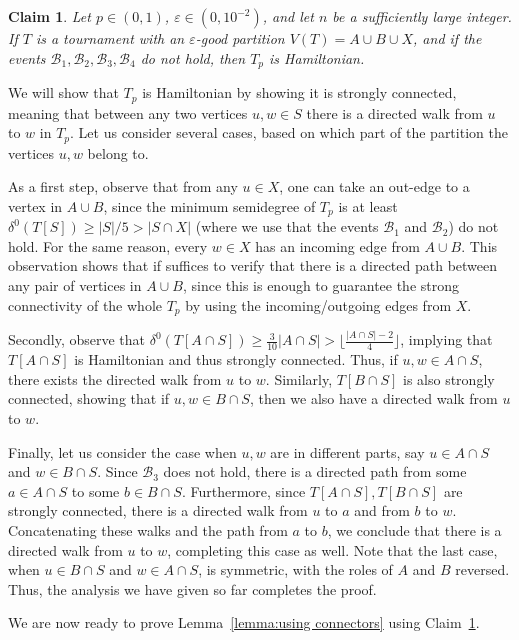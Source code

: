 \documentclass[a4paper,11pt]{article}
\makeatletter
\renewenvironment{proof}[1][\proofname] {\par\pushQED{\qed}\normalfont\topsep6\p@\@plus6\p@\relax\trivlist\item[\hskip\labelsep\textit{#1}\@addpunct{.}]\ignorespaces}{\popQED\endtrivlist\@endpefalse}
\newtheorem{claim}[theorem]{\bf Claim}
\theoremstyle{definition}
\def\eps{\varepsilon}
\def\cB{\mathcal{B}}
\makeatother
\begin{document}
\begin{claim}\label{claim:proving hamiltonicity}
Let $p\in (0, 1)$, $\eps\in (0, 10^{-2})$, and let $n$ be a sufficiently large integer. If $T$ is a tournament with an $\eps$-good partition $V(T)=A\cup B\cup X$, and if the events $\cB_1, \cB_2, \cB_3, \cB_4$ do not hold, then $T_p$ is Hamiltonian.
\end{claim}
\begin{proof}
We will show that $T_p$ is Hamiltonian by showing it is strongly connected, meaning that between any two vertices $u, w\in S$ there is a directed walk from $u$ to $w$ in $T_p$. Let us consider several cases, based on which part of the partition the vertices $u, w$ belong to. 

As a first step, observe that from any $u\in X$, one can take an out-edge to a vertex in $A\cup B$, since the minimum semidegree of $T_p$ is at least $\delta^0(T[S])\geq |S|/5 > |S\cap X|$ (where we use that the events $\cB_1$ and $\cB_2$) do not hold. For the same reason, every $w\in X$ has an incoming edge from $A\cup B$. This observation shows that if suffices to verify that there is a directed path between any pair of vertices in $A\cup B$, since this is enough to guarantee the strong connectivity of the whole $T_p$ by using the incoming/outgoing edges from $X$.

Secondly, observe that $\delta^0(T[A\cap S])\geq \frac{3}{10}|A\cap S|> \lfloor \frac{|A\cap S|-2}{4}\rfloor$, implying that $T[A\cap S]$ is Hamiltonian and thus strongly connected. Thus, if $u, w\in A\cap S$, there exists the directed walk from $u$ to $w$. Similarly, $T[B\cap S]$ is also strongly connected, showing that if $u, w\in B\cap S$, then we also have a directed walk from $u$ to $w$. 

Finally, let us consider the case when $u, w$ are in different parts, say $u\in A\cap S$ and $w\in B\cap S$. Since $\cB_3$ does not hold, there is a directed path from some $a\in A\cap S$ to some $b\in B\cap S$. Furthermore, since $T[A\cap S], T[B\cap S]$ are strongly connected, there is a directed walk from $u$ to $a$ and from $b$ to $w$. Concatenating these walks and the path from $a$ to $b$, we conclude that there is a directed walk from $u$ to $w$, completing this case as well. Note that the last case, when $u\in B\cap S$ and $w\in A\cap S$, is symmetric, with the roles of $A$ and $B$ reversed. Thus, the analysis we have given so far completes the proof.
\end{proof}

We are now ready to prove Lemma~\ref{lemma:using connectors} using Claim~\ref{claim:proving hamiltonicity}.
\end{document}
